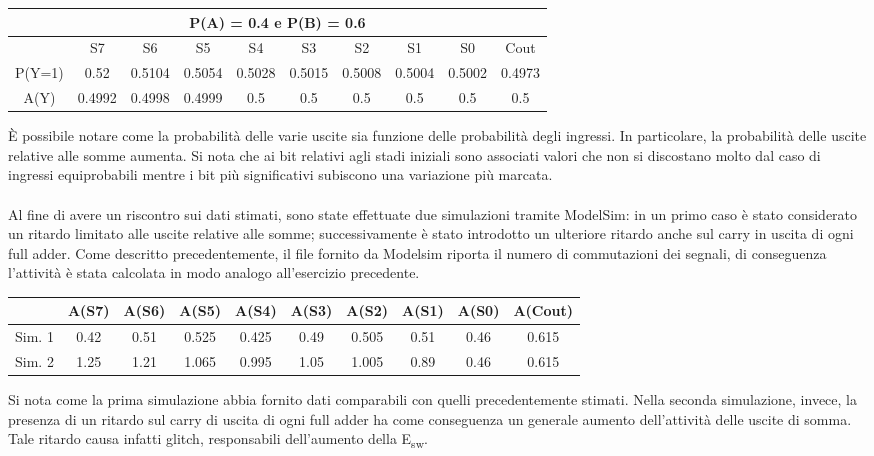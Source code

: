 \documentclass[11pt,  english, makeidx, a4paper, titlepage, oneside]{book}
\begin{document}
\vspace{0.3cm}
\begin{center}
\begin{tabular}{|c|c|c|c|c|c|c|c|c|c|}
\hline
\multicolumn{10}{c}{P(A) = 0.4 e P(B) = 0.6}\\
\hline
 & S7 & S6 & S5 & S4 & S3 & S2 & S1 & S0 & Cout \\
\hline
P(Y=1) & 0.52 & 0.5104 & 0.5054 & 0.5028 & 0.5015 & 0.5008 & 0.5004 & 0.5002 & 0.4973 \\
\hline
A(Y) & 0.4992 & 0.4998 & 0.4999 & 0.5 & 0.5 & 0.5 & 0.5 & 0.5 & 0.5 \\
\hline
\end{tabular}
\end{center}
\vspace{0.3cm}
È possibile notare come la probabilità delle varie uscite sia funzione delle probabilità degli ingressi.
In particolare, la probabilità delle uscite relative alle somme aumenta. Si nota che ai bit relativi agli stadi iniziali sono associati valori che non si discostano molto dal caso di ingressi equiprobabili mentre i bit più significativi subiscono una variazione più marcata.\\\\
Al fine di avere un riscontro sui dati stimati, sono state effettuate due simulazioni tramite ModelSim: in un primo caso è stato considerato un ritardo limitato alle uscite relative alle somme; successivamente è stato introdotto un ulteriore ritardo anche sul carry in uscita di ogni full adder.
Come descritto precedentemente, il file fornito da Modelsim riporta il numero di commutazioni dei segnali, di conseguenza l'attività è stata calcolata in modo analogo all'esercizio precedente.\\
\vspace{0.3cm}
\begin{center}
\begin{tabular}{|c|c|c|c|c|c|c|c|c|c|}
\hline
 & A(S7) & A(S6) & A(S5) & A(S4) & A(S3) & A(S2) & A(S1) & A(S0) & A(Cout) \\
\hline
Sim. 1 & 0.42 & 0.51 & 0.525 & 0.425 & 0.49 & 0.505 & 0.51 & 0.46 & 0.615 \\
\hline
Sim. 2 & 1.25 & 1.21 & 1.065 & 0.995 & 1.05 & 1.005 & 0.89 & 0.46 & 0.615 \\
\hline
\end{tabular}
\end{center}
\vspace{0.3cm}
Si nota come la prima simulazione abbia fornito dati comparabili con quelli precedentemente stimati. Nella seconda simulazione, invece, la presenza di un ritardo sul carry di uscita di ogni full adder ha come conseguenza un generale aumento dell'attività delle uscite di somma. Tale ritardo causa infatti glitch, responsabili dell'aumento della E\textsubscript{sw}.
\end{document}
